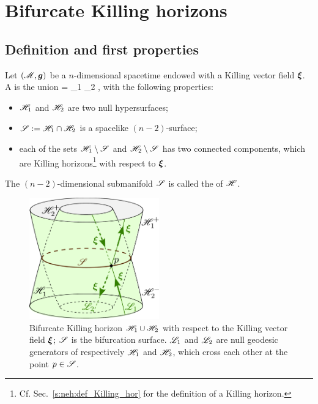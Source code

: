 

\section{Bifurcate Killing horizons} \label{s:sta:bifur_Killing_hor}

\subsection{Definition and first properties}

Let $(\mathscr{M},\bm{g})$ be a $n$-dimensional spacetime endowed with a Killing vector
field $\bm{\xi}$. A
 is the
union
\be
    \Hor = \Hor_1 \cup \Hor_2 ,
\ee
with the following properties:
\begin{itemize}
\item $\mathscr{H}_1$ and $\mathscr{H}_2$ are two null hypersurfaces;
\item $\mathscr{S}:=\mathscr{H}_1\cap\mathscr{H}_2$ is a spacelike $(n-2)$-surface;
\item each of the sets $\mathscr{H}_1\setminus\mathscr{S}$ and $\mathscr{H}_2\setminus\mathscr{S}$ has two connected components, which are
Killing horizons\footnote{Cf. Sec.~\ref{s:neh:def_Killing_hor} for the
definition of a Killing horizon.} with respect to $\bm{\xi}$.
\end{itemize}
The $(n-2)$-dimensional submanifold $\mathscr{S}$ is called the
 of $\mathscr{H}$.

\begin{figure}
\centerline{\includegraphics[width=0.5\textwidth]{sta_bifur_Kill_hor.pdf}}
\caption[]{\label{f:sta:bifur_Kill_hor} \footnotesize
Bifurcate Killing horizon $\mathscr{H}_1\cup\mathscr{H}_2$ with respect to the Killing vector
field $\bm{\xi}$; $\mathscr{S}$ is the bifurcation surface. $\mathscr{L}_1$ and $\mathscr{L}_2$ are
null geodesic generators of respectively $\mathscr{H}_1$ and $\mathscr{H}_2$, which cross
each other at the point $p\in\mathscr{S}$.}
\end{figure}

